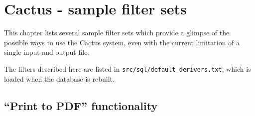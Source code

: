 





\chapter{Cactus - sample filter sets}
\label{cha:cactus-sample-filter-sets}

This chapter lists several sample filter sets which provide a glimpse
of the possible ways to use the Cactus system, even with the current
limitation of a single input and output file.

The filters described here are listed in
\texttt{src/sql/default_derivers.txt}, which is loaded when the
database is rebuilt.


\section{``Print to PDF'' functionality}
\label{sec:network-adobe-acrobat-pdf-printer}





